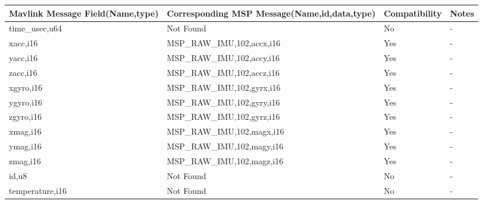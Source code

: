 {
\centering
\begin{tabular}{ |p{4cm  } |p{7cm} | p{2cm}|m{5em}|}
\hline
Mavlink Message Field(Name,type)&Corresponding MSP Message(Name,id,data,type)& Compatibility & Notes\\
\hline
time\_usec,u64 & Not Found & No & - \\
\hline
\rowcolor{green}
xacc,i16 &MSP\_RAW\_IMU,102,accx,i16& Yes & - \\
\hline
\rowcolor{green}
yacc,i16 &MSP\_RAW\_IMU,102,accy,i16& Yes & - \\
\hline
\rowcolor{green}
zacc,i16 &MSP\_RAW\_IMU,102,accz,i16& Yes & - \\
\hline
\rowcolor{green}
xgyro,i16 &MSP\_RAW\_IMU,102,gyrx,i16& Yes & - \\
\hline
\rowcolor{green}
ygyro,i16 &MSP\_RAW\_IMU,102,gyry,i16& Yes & - \\
\hline
\rowcolor{green}
zgyro,i16 &MSP\_RAW\_IMU,102,gyrz,i16& Yes & - \\
\hline
\rowcolor{green}
xmag,i16 &MSP\_RAW\_IMU,102,magx,i16& Yes & - \\
\hline
\rowcolor{green}
ymag,i16 &MSP\_RAW\_IMU,102,magy,i16& Yes & - \\
\hline
\rowcolor{green}
zmag,i16 &MSP\_RAW\_IMU,102,magz,i16& Yes & - \\
\hline
id,u8 & Not Found & No & - \\
\hline
temperature,i16 & Not Found & No & - \\

\end{tabular}
}

\cleardoublepage

